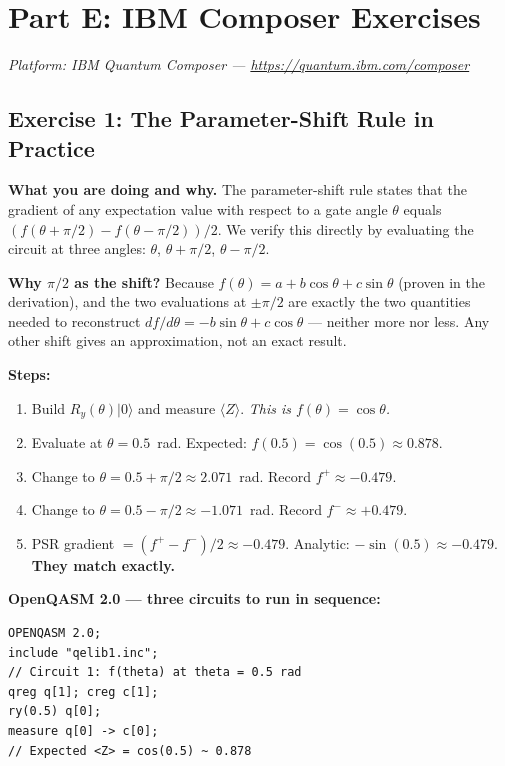 \documentclass[a4paper,11pt]{article}
\newcommand{\ket}[1]{|#1\rangle}
\begin{document}
\section{Part E: IBM Composer Exercises}

\textit{Platform: IBM Quantum Composer — \url{https://quantum.ibm.com/composer}}

\subsection{Exercise 1: The Parameter-Shift Rule in Practice}

\begin{studentbox}
\textbf{What you are doing and why.} The parameter-shift rule states that
the gradient of any expectation value with respect to a gate angle $\theta$
equals $(f(\theta+\pi/2) - f(\theta-\pi/2))/2$. We verify this directly by
evaluating the circuit at three angles: $\theta$, $\theta+\pi/2$,
$\theta-\pi/2$.

\textbf{Why $\pi/2$ as the shift?} Because $f(\theta) = a+b\cos\theta+c\sin\theta$
(proven in the derivation), and the two evaluations at $\pm\pi/2$ are exactly
the two quantities needed to reconstruct $df/d\theta = -b\sin\theta + c\cos\theta$
— neither more nor less. Any other shift gives an approximation, not an
exact result.

\medskip
\textbf{Steps:}
\begin{enumerate}
    \item Build $R_y(\theta)\ket{0}$ and measure $\langle Z\rangle$.
          \emph{This is $f(\theta)=\cos\theta$.}
    \item Evaluate at $\theta = 0.5$~rad. Expected: $f(0.5) = \cos(0.5) \approx 0.878$.
    \item Change to $\theta = 0.5 + \pi/2 \approx 2.071$~rad. Record $f^+ \approx -0.479$.
    \item Change to $\theta = 0.5 - \pi/2 \approx -1.071$~rad. Record $f^- \approx +0.479$.
    \item PSR gradient $= (f^+-f^-)/2 \approx -0.479$.
          Analytic: $-\sin(0.5) \approx -0.479$. \textbf{They match exactly.}
\end{enumerate}

\medskip
\textbf{OpenQASM 2.0 — three circuits to run in sequence:}
\begin{lstlisting}[language={}]
OPENQASM 2.0;
include "qelib1.inc";
// Circuit 1: f(theta) at theta = 0.5 rad
qreg q[1]; creg c[1];
ry(0.5) q[0];
measure q[0] -> c[0];
// Expected <Z> = cos(0.5) ~ 0.878


\end{lstlisting}
\end{studentbox}
\end{document}
